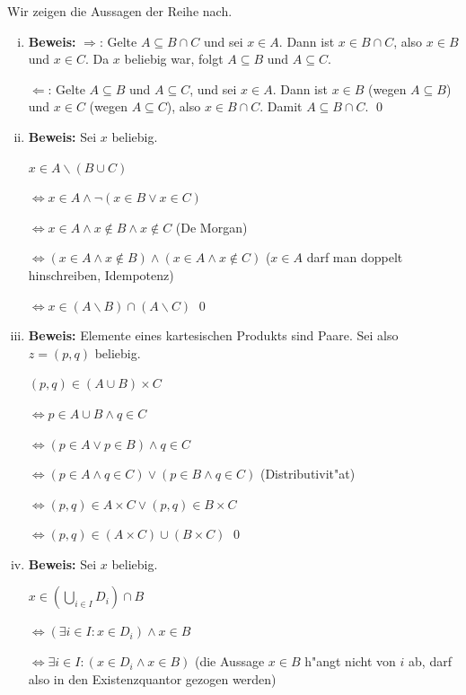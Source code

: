 \begin{loesung}
Wir zeigen die Aussagen der Reihe nach.
\begin{enumerate}[(i)]
\item \textbf{Beweis:} \glqq $\Rightarrow$\grqq: Gelte $A\subseteq B\cap C$ und sei $x\in A$. Dann ist $x\in B\cap C$, also $x\in B$ und $x\in C$. Da $x$ beliebig war, folgt $A\subseteq B$ und $A\subseteq C$.

\glqq $\Leftarrow$\grqq: Gelte $A\subseteq B$ und $A\subseteq C$, und sei $x\in A$. Dann ist $x\in B$ (wegen $A\subseteq B$) und $x\in C$ (wegen $A\subseteq C$), also $x\in B\cap C$. Damit $A\subseteq B\cap C$. \qed

\item \textbf{Beweis:} Sei $x$ beliebig.

$x\in A\backslash(B\cup C)$

$\Leftrightarrow x\in A\wedge\neg(x\in B\vee x\in C)$

$\Leftrightarrow x\in A\wedge x\notin B\wedge x\notin C$ (De Morgan)

$\Leftrightarrow (x\in A\wedge x\notin B)\wedge(x\in A\wedge x\notin C)$ ($x\in A$ darf man doppelt hinschreiben, Idempotenz)

$\Leftrightarrow x\in(A\backslash B)\cap(A\backslash C)$ \qed

\item \textbf{Beweis:} Elemente eines kartesischen Produkts sind Paare. Sei also $z=(p,q)$ beliebig.

$(p,q)\in(A\cup B)\times C$

$\Leftrightarrow p\in A\cup B\wedge q\in C$

$\Leftrightarrow (p\in A\vee p\in B)\wedge q\in C$

$\Leftrightarrow (p\in A\wedge q\in C)\vee(p\in B\wedge q\in C)$ (Distributivit"at)

$\Leftrightarrow (p,q)\in A\times C\vee (p,q)\in B\times C$

$\Leftrightarrow (p,q)\in(A\times C)\cup(B\times C)$ \qed

\item \textbf{Beweis:} Sei $x$ beliebig.

$x\in\left(\bigcup_{i\in I}D_i\right)\cap B$

$\Leftrightarrow \left(\exists i\in I: x\in D_i\right)\wedge x\in B$

$\Leftrightarrow \exists i\in I:(x\in D_i\wedge x\in B)$ (die Aussage $x\in B$ h"angt nicht von $i$ ab, darf also in den Existenzquantor gezogen werden)


\end{enumerate}
\end{loesung}
